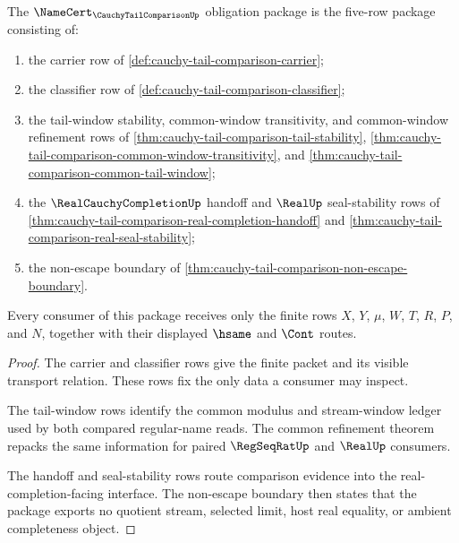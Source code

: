\begin{theorem}
\label{thm:cauchy-tail-comparison-namecert-obligation-package}
The $\NameCert_{\CauchyTailComparisonUp}$ obligation package is the five-row package consisting of:
\begin{enumerate}
\item the carrier row of \autoref{def:cauchy-tail-comparison-carrier};
\item the classifier row of \autoref{def:cauchy-tail-comparison-classifier};
\item the tail-window stability, common-window transitivity, and common-window refinement rows of \autoref{thm:cauchy-tail-comparison-tail-stability}, \autoref{thm:cauchy-tail-comparison-common-window-transitivity}, and \autoref{thm:cauchy-tail-comparison-common-tail-window};
\item the $\RealCauchyCompletionUp$ handoff and $\RealUp$ seal-stability rows of \autoref{thm:cauchy-tail-comparison-real-completion-handoff} and \autoref{thm:cauchy-tail-comparison-real-seal-stability};
\item the non-escape boundary of \autoref{thm:cauchy-tail-comparison-non-escape-boundary}.
\end{enumerate}
Every consumer of this package receives only the finite rows $X$, $Y$, $\mu$, $W$, $T$, $R$, $P$, and $N$, together with their displayed $\hsame$ and $\Cont$ routes.
\end{theorem}
\begin{proof}
The carrier and classifier rows give the finite packet and its visible transport relation. These rows fix the only data a consumer may inspect.

The tail-window rows identify the common modulus and stream-window ledger used by both compared regular-name reads. The common refinement theorem repacks the same information for paired $\RegSeqRatUp$ and $\RealUp$ consumers.

The handoff and seal-stability rows route comparison evidence into the real-completion-facing interface. The non-escape boundary then states that the package exports no quotient stream, selected limit, host real equality, or ambient completeness object.
\end{proof}

